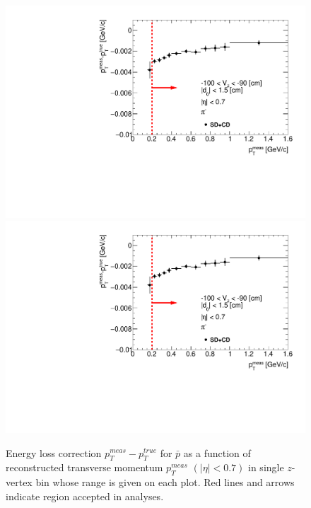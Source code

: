 \begin{figure}[H]
\caption[Energy loss correction for $\bar{p}$ as a function of reconstructed transverse momentum $p_T^{meas}$.]{Energy loss correction $p_T^{meas}-p_T^{true}$ for $\bar{p}$ as a function of reconstructed transverse momentum $p_T^{meas}$ $\left(|\eta|<0.7\right)$ in single $z$-vertex bin whose range is given on each plot. Red lines and arrows indicate region accepted in analyses.}\label{fig:energyLossPrimaryP_bar}
\parbox{0.329\textwidth}{
  \includegraphics[width=\linewidth,page=43]{graphics/energyLoss/energyLoss3D_OnePrtAlso.pdf}\\
  \includegraphics[width=\linewidth,page=46]{graphics/energyLoss/energyLoss3D_OnePrtAlso.pdf}\\
}
\end{figure}
